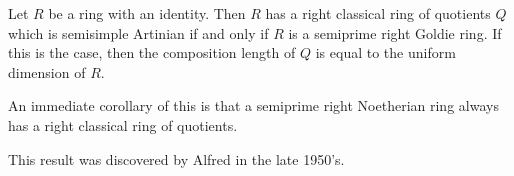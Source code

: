 \documentclass[12pt]{article}
\begin{document}
Let $R$ be a ring with an identity.  Then $R$ has a right classical ring of quotients $Q$ which is semisimple Artinian if and only if $R$ is a semiprime right Goldie ring.  If this is the case, then the composition length of $Q$ is equal to the uniform dimension of $R$.

An immediate corollary of this is that a semiprime right Noetherian ring always has a right classical ring of quotients.

This result was discovered by Alfred  in the late 1950's.
\end{document}
